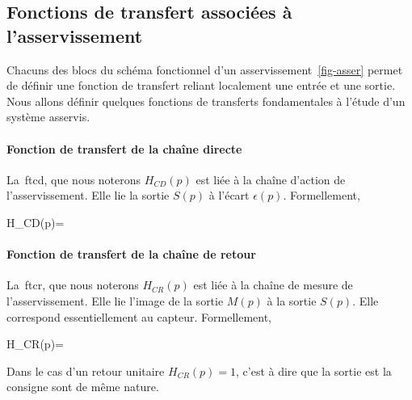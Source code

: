 \clearpage
\subsection{Fonctions de transfert associées à l'asservissement}
Chacuns des blocs du schéma fonctionnel d'un asservissement~\cref{fig-asser} 
permet de définir une fonction de transfert reliant localement une entrée 
et une sortie.
Nous allons définir quelques fonctions de transferts fondamentales à 
l'étude d'un système asservis.
\paragraph{Fonction de transfert de la chaîne directe}
La~\gls{ftcd}, que nous noterons $H_{CD}(p)$ est liée à 
la chaîne d'action de l'asservissement. Elle lie la sortie $S(p)$ à 
l'écart $\epsilon(p)$. Formellement,
\begin{bequation}
H_{CD}(p)=
\end{bequation}
\paragraph{Fonction de transfert de la chaîne de retour}
La~\gls{ftcr}, que nous noterons $H_{CR}(p)$ est 
liée à la chaîne de mesure de l'asservissement. Elle lie l'image 
de la sortie $M(p)$ à la sortie $S(p)$. 
Elle correspond essentiellement au capteur.
Formellement,
\begin{bequation}
    H_{CR}(p)=
\end{bequation}
Dans le cas d'un retour unitaire $H_{CR}(p)=1$, c'est à dire que la sortie est 
la consigne sont de même nature.

